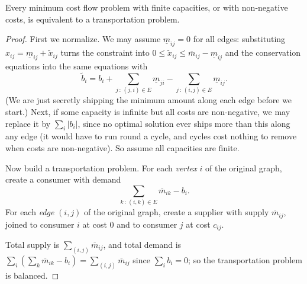 \begin{theorem}
    Every minimum cost flow problem with finite capacities, or with non-negative costs, is equivalent to a transportation problem.
\end{theorem}
\begin{proof}
    First we normalize. We may assume $\underline m_{ij} = 0$ for all edges: substituting $x_{ij} = \underline m_{ij} + \tilde x_{ij}$ turns the constraint into $0 \leq \tilde x_{ij} \leq \overline m_{ij} - \underline m_{ij}$ and the conservation equations into the same equations with
    $$
    \tilde b_i = b_i + \sum_{j\,:\,(j,i)\in E}\underline m_{ji} - \sum_{j\,:\,(i,j)\in E}\underline m_{ij}.
    $$
    (We are just secretly shipping the minimum amount along each edge before we start.) Next, if some capacity is infinite but all costs are non-negative, we may replace it by $\sum_i|b_i|$, since no optimal solution ever ships more than this along any edge (it would have to run round a cycle, and cycles cost nothing to remove when costs are non-negative). So assume all capacities are finite.

    Now build a transportation problem. For each \emph{vertex} $i$ of the original graph, create a consumer with demand
    $$
    \sum_{k\,:\,(i,k)\in E}\overline m_{ik} - b_i.
    $$
    For each \emph{edge} $(i,j)$ of the original graph, create a supplier with supply $\overline m_{ij}$, joined to consumer $i$ at cost $0$ and to consumer $j$ at cost $c_{ij}$.
\begin{center}
\end{center}
    Total supply is $\sum_{(i,j)}\overline m_{ij}$, and total demand is $\sum_i\left(\sum_k \overline m_{ik} - b_i\right) = \sum_{(i,j)}\overline m_{ij}$ since $\sum_i b_i = 0$; so the transportation problem is balanced.


\end{proof}
